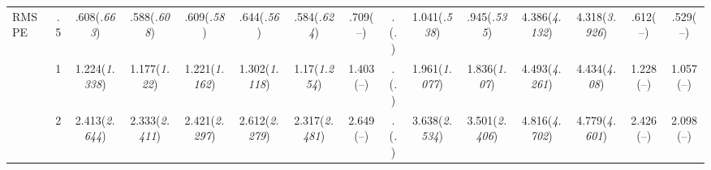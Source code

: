 \documentclass{article}
\begin{document}
\begin{table}[tbp]
{\begin{tabularx}{\textwidth}{lCCCCCCCCCCCCCC}
\midrule RMSPE&.5&.608\newline (\emph{.663})&.588\newline (\emph{.608})&.609\newline (\emph{.58})&.644\newline (\emph{.56})&.584\newline (\emph{.624})&.709\newline (--)&.\newline (\emph{.})&1.041\newline (\emph{.538})&.945\newline (\emph{.535})&4.386\newline (\emph{4.132})&4.318\newline (\emph{3.926})&.612\newline (--)&.529\newline (--) \tabularnewline
&1&1.224\newline (\emph{1.338})&1.177\newline (\emph{1.22})&1.221\newline (\emph{1.162})&1.302\newline (\emph{1.118})&1.17\newline (\emph{1.254})&1.403\newline (--)&.\newline (\emph{.})&1.961\newline (\emph{1.077})&1.836\newline (\emph{1.07})&4.493\newline (\emph{4.261})&4.434\newline (\emph{4.08})&1.228\newline (--)&1.057\newline (--) \tabularnewline
&2&2.413\newline (\emph{2.644})&2.333\newline (\emph{2.411})&2.421\newline (\emph{2.297})&2.612\newline (\emph{2.279})&2.317\newline (\emph{2.481})&2.649\newline (--)&.\newline (\emph{.})&3.638\newline (\emph{2.534})&3.501\newline (\emph{2.406})&4.816\newline (\emph{4.702})&4.779\newline (\emph{4.601})&2.426\newline (--)&2.098\newline (--) \tabularnewline

\end{tabularx}}
\end{table}
\end{document}
